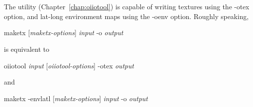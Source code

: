 \begin{comment}

\subsection{{\cf maketx} Recipes}


This section will give quick examples of common uses of {\cf maketx}.

\subsection*{Converting between file formats}

It's a snap to converting among image formats supported by \product
(i.e., for which \ImageInput and \ImageOutput plugins can be found).
The {\cf maketx} utility will simply infer the file format from the
file extension. The following example converts a PNG image to JPEG:

\begin{code}
    maketx lena.png lena.jpg
\end{code}

\end{comment}


\section{\oiiotool}
\label{sec:oiiotooltex}

The \oiiotool utility (Chapter~\ref{chap:oiiotool}) is capable of writing
textures using the {\cf -otex} option, and lat-long environment maps using
the {\cf -oenv} option. Roughly speaking,

\medskip

\hspace{0.25in} {\cf maketx} [\emph{maketx-options}] \emph{input} {\cf -o} \emph{output}

\medskip

\noindent is equivalent to

\medskip

\hspace{0.25in} {\cf oiiotool} \emph{input} [\emph{oiiotool-options}] {\cf -otex} \emph{output}

\medskip

\noindent and

\medskip

\hspace{0.25in} {\cf maketx -envlatl} [\emph{maketx-options}] \emph{input} {\cf -o} \emph{output}

